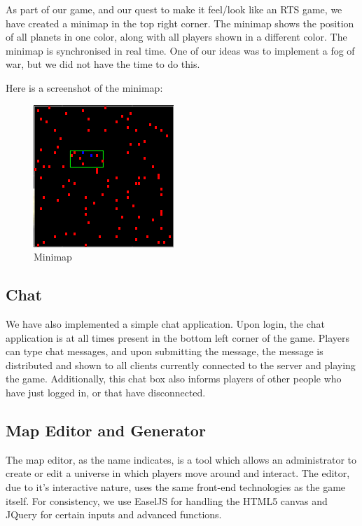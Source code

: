 \documentclass[a4paper,11pt]{article}
\begin{document}
			As part of our game, and our quest to make it feel/look like an RTS game, we have created a minimap in the top right corner. The minimap shows the position of all planets in one color, along with all players shown in a different color. The minimap is synchronised in real time. One of our ideas was to implement a fog of war, but we did not have the time to do this.
			
			Here is a screenshot of the minimap:
			
			\begin{figure}[htb]
			\begin{center}
			\leavevmode
			\includegraphics[scale=0.7]{minimap.png}
			\end{center}
			\caption{Minimap}
			\label{fig:minimap}
			\end{figure}
			
			
		\subsection{Chat}
			
			We have also implemented a simple chat application. Upon login, the chat application is at all times present in the bottom left corner of the game. Players can type chat messages, and upon submitting the message, the message is distributed and shown to all clients currently connected to the server and playing the game. Additionally, this chat box also informs players of other people who have just logged in, or that have disconnected.
			
		\subsection{Map Editor and Generator}
		
		The map editor, as the name indicates, is a tool which allows an administrator to create or edit a universe in which players move around and interact. The editor, due to it's interactive nature, uses the same front-end technologies as the game itself. For consistency, we use EaselJS for handling the HTML5 canvas and JQuery for certain inputs and advanced functions.
\end{document}

